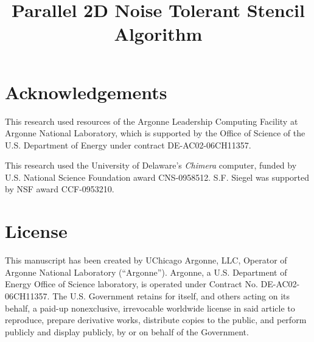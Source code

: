 \documentclass{article}
\theoremstyle{definition}
\begin{document}
%
\title{Parallel 2D Noise Tolerant Stencil Algorithm}

%








\section{Acknowledgements}

This research used resources of the Argonne Leadership Computing
Facility at Argonne National Laboratory, which
is supported by the Office of Science of the U.S.
Department of Energy under contract DE-AC02-06CH11357.

This research used the University of Delaware's \emph{Chimera}
computer, funded by U.S. National Science Foundation award CNS-0958512.
S.F. Siegel was supported by NSF award CCF-0953210.

%
%

\section{License}

This manuscript has been created by UChicago Argonne, LLC, Operator of %
Argonne National Laboratory (``Argonne'').  Argonne, a U.S. Department of Energy
Office of Science laboratory, is operated under Contract No. DE-AC02-06CH11357.
The U.S. Government retains for itself, and others acting on its behalf, a
paid-up nonexclusive, irrevocable worldwide license in said article to reproduce,
prepare derivative works, distribute copies to the public, and perform publicly
and display publicly, by or on behalf of the Government.
\end{document}
